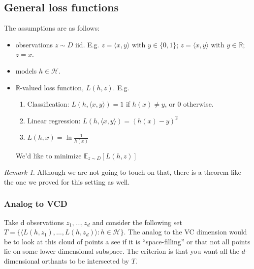 \documentclass[12pt, letterpaper]{article}
\numberwithin{equation}{section} %
\newcommand{\R}{\mathbb{R}}
\newcommand{\mb}{\mathbb}
\newcommand{\mc}{\mathcal}
\theoremstyle{definition}
\theoremstyle{remark}
\newtheorem{remark}[theorem]{Remark}
\begin{document}
\subsection{General loss functions}
The assumptions are as follows:
\begin{itemize}
\item observations $z \sim D$ iid. E.g. $z = \langle x, y\rangle$ with $y\in\lbrace 0,1\rbrace$;  $z = \langle x, y\rangle$ with $y\in\R$; $z=x$.
\item models $h\in\mc H$.
\item $\R$-valued loss function, $L(h,z)$. E.g.
    \begin{enumerate}
    \item Classification: $L(h, \langle x,y \rangle) = 1$ if $h(x)\ne y$, or 0 otherwise.
    \item Linear regression: $L(h, \langle x,y \rangle) = (h(x)-y)^2$
    \item $L(h,x)= \ln \frac1{h(x)}$
    \end{enumerate}
     We'd like to minimize $\mb E_{z\sim D}[L(h,z)]$
\end{itemize}
\begin{remark}
    Although we are not going to touch on that, there is a theorem like the one we proved for this setting as well.
\end{remark}
\subsubsection{Analog to VCD}
Take d observations $z_1,\ldots,z_d$ and consider the following set $T=\lbrace\langle L(h, z_1),\ldots,L(h,z_d)\rangle:h\in\mc H\rbrace$. The analog to the VC dimension would be to look at this cloud of points a see if it is ``space-filling'' or that not all points lie on some lower dimensional subspace. The criterion is that you want all the $d$-dimensional orthants to be intersected by $T$.
\end{document}

